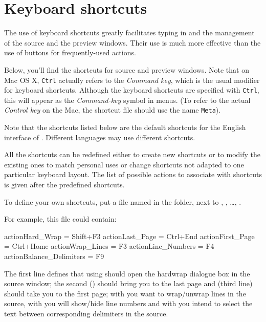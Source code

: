\section{Keyboard shortcuts}
\label{sec.shortcuts}

The use of keyboard shortcuts greatly facilitates typing in and the management of the source and the preview windows. Their use is much more effective than the use of buttons for frequently-used actions.

Below, you'll find the shortcuts for source and preview windows. Note that on Mac OS X, \verb|Ctrl| actually refers to the \emph{Command key}, which is the usual modifier for keyboard shortcuts. Although the keyboard shortcuts are specified with \verb|Ctrl|, this will appear as the \emph{Command-key} symbol in menus. (To refer to the actual \emph{Control key} on the Mac, the shortcut file should use the name \verb|Meta|).

Note that the shortcuts listed below are the default shortcuts for the English interface of {\Tw}. Different languages may use different shortcuts.

All the shortcuts can be redefined either to create new shortcuts or to modify the existing ones to match personal uses or change shortcuts not adapted to one particular keyboard layout. The list of possible actions to associate with shortcuts is given after the predefined shortcuts.

To define your own shortcuts, put a file named  in the  folder, next to , , \dots, .

For example, this  file could contain:
\begin{verbExample}
actionHard_Wrap = Shift+F3
actionLast_Page = Ctrl+End
actionFirst_Page = Ctrl+Home
actionWrap_Lines = F3
actionLine_Numbers = F4
actionBalance_Delimiters = F9
\end{verbExample}

The first line defines that using  should open the hardwrap dialogue box in the source window; the second () should bring you to the last page and  (third line) should take you to the first page; with  you want to wrap/unwrap lines in the source, with  you will show/hide line numbers and with  you intend to select the text between corresponding delimiters in the source.

